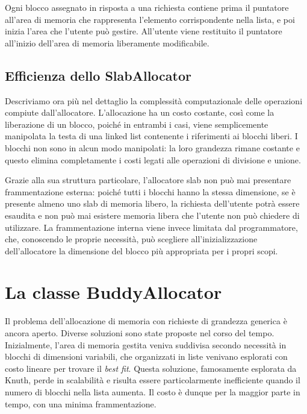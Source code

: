 Ogni blocco assegnato in risposta a una richiesta contiene prima il puntatore all’area di memoria che rappresenta l’elemento corrispondente nella lista, e poi inizia l’area che l’utente può gestire. All’utente viene restituito il puntatore all’inizio dell’area di memoria liberamente modificabile.

\subsection{Efficienza dello SlabAllocator}

Descriviamo ora più nel dettaglio la complessità computazionale delle operazioni compiute dall’allocatore. L’allocazione ha un costo costante, così come la liberazione di un blocco, poiché in entrambi i casi, viene semplicemente manipolata la testa di una linked list contenente i riferimenti ai blocchi liberi. I blocchi non sono in alcun modo manipolati: la loro grandezza rimane costante e questo elimina completamente i costi legati alle operazioni di divisione e unione.

Grazie alla sua struttura particolare, l’allocatore slab non può mai presentare frammentazione esterna: poiché tutti i blocchi hanno la stessa dimensione, se è presente almeno uno slab di memoria libero, la richiesta dell’utente potrà essere esaudita e non può mai esistere memoria libera che l’utente non può chiedere di utilizzare. La frammentazione interna viene invece limitata dal programmatore, che, conoscendo le proprie necessità, può scegliere all’inizializzazione dell’allocatore la dimensione del blocco più appropriata per i propri scopi.

\section{La classe BuddyAllocator}

Il problema dell’allocazione di memoria con richieste di grandezza generica è ancora aperto. Diverse soluzioni sono state proposte nel corso del tempo. Inizialmente, l’area di memoria gestita veniva suddivisa secondo necessità in blocchi di dimensioni variabili, che organizzati in liste venivano esplorati con costo lineare per trovare il \textit{best fit}. Questa soluzione, famosamente esplorata da Knuth, perde in scalabilità e risulta essere particolarmente inefficiente quando il numero di blocchi nella lista aumenta. Il costo è dunque per la maggior parte in tempo, con una minima frammentazione.

